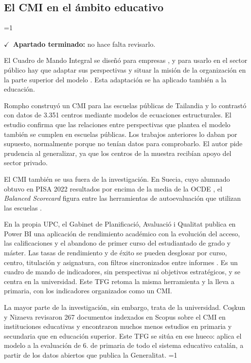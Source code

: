 \documentclass[12pt, a4paper, oneside]{report}
\newcommand{\mostrarterminados}{1}
\newenvironment{revisado}
  {\ifnum\mostrarterminados=1\relax\begin{cajarevisada}\noindent\colorbox{verdeterminado}{\parbox{\dimexpr\linewidth-2\fboxsep\relax}{\small$\checkmark$\ \textbf{Apartado terminado:} no hace falta revisarlo.}}\par\medskip\fi}
  {\ifnum\mostrarterminados=1\relax\end{cajarevisada}\fi}
\begin{document}
\subsection{El CMI en el ámbito educativo}
\begin{revisado}
El Cuadro de Mando Integral se diseñó para empresas \cite{kaplan1992balanced}, y para usarlo en el sector público hay que adaptar sus perspectivas y situar la misión de la organización en la parte superior del modelo \cite{niven2008balanced}. Esta adaptación se ha aplicado también a la educación.

Rompho \cite{rompho2020balanced} construyó un CMI para las escuelas públicas de Tailandia y lo contrastó con datos de 3.351 centros mediante modelos de ecuaciones estructurales. El estudio confirma que las relaciones entre perspectivas que plantea el modelo también se cumplen en escuelas públicas. Los trabajos anteriores lo daban por supuesto, normalmente porque no tenían datos para comprobarlo. El autor pide prudencia al generalizar, ya que los centros de la muestra recibían apoyo del sector privado.

El CMI también se usa fuera de la investigación. En Suecia, cuyo alumnado obtuvo en PISA 2022 resultados por encima de la media de la OCDE \cite{oecd2023pisa_sweden}, el \textit{Balanced Scorecard} figura entre las herramientas de autoevaluación que utilizan las escuelas \cite[p.~166]{oecd2015sweden}.

En la propia UPC, el Gabinet de Planificació, Avaluació i Qualitat publica en Power BI una aplicación de rendimiento académico con la evolución del acceso, las calificaciones y el abandono de primer curso del estudiantado de grado y máster. Las tasas de rendimiento y de éxito se pueden desglosar por curso, centro, titulación y asignatura, con filtros sincronizados entre informes \cite{gpaq2021rendiment}. Es un cuadro de mando de indicadores, sin perspectivas ni objetivos estratégicos, y se centra en la universidad. Este TFG retoma la misma herramienta y la lleva a primaria, con los indicadores organizados como un CMI.

La mayor parte de la investigación, sin embargo, trata de la universidad. Co\c{s}kun y Nizaeva \cite{coskun2023strategic} revisaron 267 documentos indexados en Scopus sobre el CMI en instituciones educativas y encontraron muchos menos estudios en primaria y secundaria que en educación superior. Este TFG se sitúa en ese hueco: aplica el modelo a la evaluación de 6.\textordmasculine{} de primaria de todo el sistema educativo catalán, a partir de los datos abiertos que publica la Generalitat.
\end{revisado}
\end{document}

